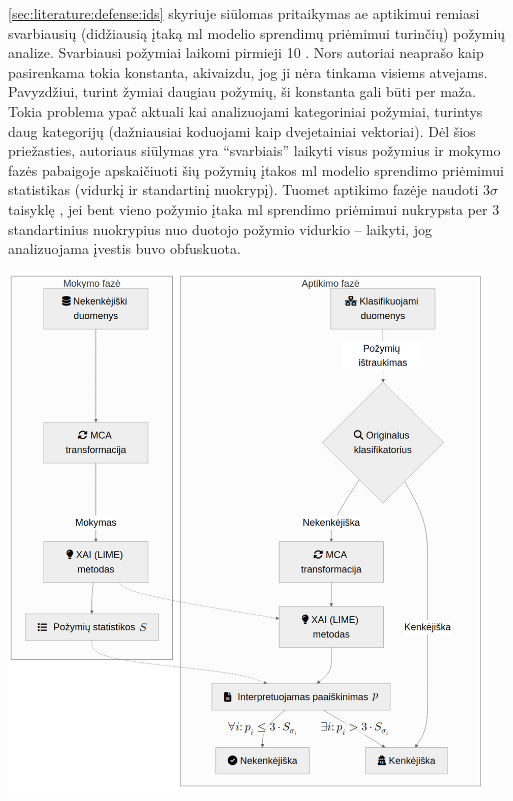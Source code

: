 \noindent
\begin{minipage}{0.45\textwidth}
    \hspace{1cm}
    \ref{sec:literature:defense:ids} skyriuje siūlomas \LIME pritaikymas \gls{ae} aptikimui remiasi svarbiausių (didžiausią įtaką \gls{ml} modelio sprendimų priėmimui turinčių) požymių analize. Svarbiausi požymiai laikomi pirmieji 10 \cite{tcydenovaDetectionAdversarialAttacks2021}. Nors autoriai neaprašo kaip pasirenkama tokia konstanta, akivaizdu, jog ji nėra tinkama visiems atvejams. Pavyzdžiui, turint žymiai daugiau požymių, ši konstanta gali būti per maža. Tokia problema ypač aktuali kai analizuojami kategoriniai požymiai, turintys daug kategorijų (dažniausiai koduojami kaip dvejetainiai vektoriai). Dėl šios priežasties, autoriaus siūlymas yra \enquote{svarbiais} laikyti visus požymius ir mokymo fazės pabaigoje apskaičiuoti šių požymių įtakos \gls{ml} modelio sprendimo priėmimui statistikas (vidurkį ir standartinį nuokrypį). Tuomet aptikimo fazėje naudoti $3 \sigma$ taisyklę \cite{pukelsheimThreeSigmaRule1994}, \ty jei bent vieno požymio įtaka \gls{ml} sprendimo priėmimui nukrypsta per 3 standartinius nuokrypius nuo duotojo požymio vidurkio -- laikyti, jog analizuojama įvestis buvo obfuskuota.
\end{minipage}
\hspace{0.02\textwidth}
\begin{minipage}{0.58\textwidth}
    \includegraphics[width=0.95\textwidth]{images/original.png}
    \label{fig:original}
\end{minipage}

